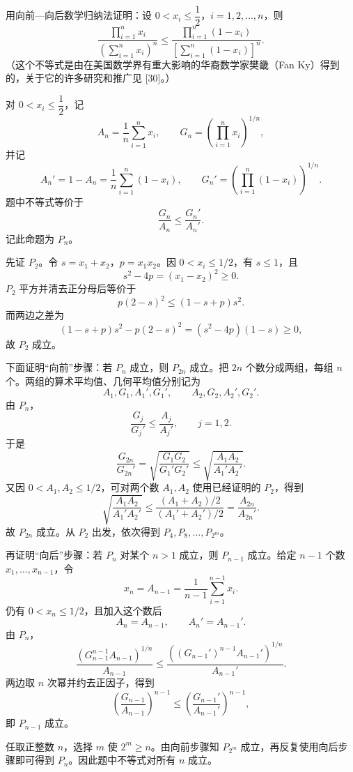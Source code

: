 \begin{xexercise}[7]
用向前—向后数学归纳法证明：设 $0<x_i\le\dfrac12$，$i=1,2,\ldots,n$，则
\[
  \frac{\displaystyle\prod_{i=1}^n x_i}
       {\left(\displaystyle\sum_{i=1}^n x_i\right)^n}
  \le
  \frac{\displaystyle\prod_{i=1}^n(1-x_i)}
       {\left[\displaystyle\sum_{i=1}^n(1-x_i)\right]^n}.
\]
（这个不等式是由在美国数学界有重大影响的华裔数学家樊畿（Fan Ky）得到的，关于它的许多研究和推广见 [30]。）
\end{xexercise}
\begin{xsolution}
对 $0<x_i\le\dfrac12$，记
\[
  A_n=\frac1n\sum_{i=1}^n x_i,
  \qquad
  G_n=\left(\prod_{i=1}^n x_i\right)^{1/n},
\]
并记
\[
  A_n'=1-A_n=\frac1n\sum_{i=1}^n(1-x_i),
  \qquad
  G_n'=\left(\prod_{i=1}^n(1-x_i)\right)^{1/n}.
\]
题中不等式等价于
\[
  \frac{G_n}{A_n}\le\frac{G_n'}{A_n'}.
\]
记此命题为 $P_n$。

先证 $P_2$。令 $s=x_1+x_2$，$p=x_1x_2$。因 $0<x_i\le1/2$，有 $s\le1$，且
\[
  s^2-4p=(x_1-x_2)^2\ge0.
\]
$P_2$ 平方并清去正分母后等价于
\[
  p(2-s)^2\le(1-s+p)s^2.
\]
而两边之差为
\[
  (1-s+p)s^2-p(2-s)^2
  =(s^2-4p)(1-s)\ge0,
\]
故 $P_2$ 成立。

下面证明“向前”步骤：若 $P_n$ 成立，则 $P_{2n}$ 成立。把 $2n$ 个数分成两组，每组 $n$ 个。两组的算术平均值、几何平均值分别记为
\[
  A_1,G_1,A_1',G_1',
  \qquad
  A_2,G_2,A_2',G_2'.
\]
由 $P_n$，
\[
  \frac{G_j}{G_j'}\le\frac{A_j}{A_j'},\qquad j=1,2.
\]
于是
\[
  \frac{G_{2n}}{G_{2n}'}
  =\sqrt{\frac{G_1G_2}{G_1'G_2'}}
  \le\sqrt{\frac{A_1A_2}{A_1'A_2'}}.
\]
又因 $0<A_1,A_2\le1/2$，可对两个数 $A_1,A_2$ 使用已经证明的 $P_2$，得到
\[
  \sqrt{\frac{A_1A_2}{A_1'A_2'}}
  \le\frac{(A_1+A_2)/2}{(A_1'+A_2')/2}
  =\frac{A_{2n}}{A_{2n}'}.
\]
故 $P_{2n}$ 成立。从 $P_2$ 出发，依次得到 $P_4,P_8,\ldots,P_{2^m}$。

再证明“向后”步骤：若 $P_n$ 对某个 $n>1$ 成立，则 $P_{n-1}$ 成立。给定 $n-1$ 个数 $x_1,\ldots,x_{n-1}$，令
\[
  x_n=A_{n-1}=\frac1{n-1}\sum_{i=1}^{n-1}x_i.
\]
仍有 $0<x_n\le1/2$，且加入这个数后
\[
  A_n=A_{n-1},\qquad A_n'=A_{n-1}'.
\]
由 $P_n$，
\[
  \frac{(G_{n-1}^{n-1}A_{n-1})^{1/n}}{A_{n-1}}
  \le
  \frac{((G_{n-1}')^{n-1}A_{n-1}')^{1/n}}{A_{n-1}'}.
\]
两边取 $n$ 次幂并约去正因子，得到
\[
  \left(\frac{G_{n-1}}{A_{n-1}}\right)^{n-1}
  \le
  \left(\frac{G_{n-1}'}{A_{n-1}'}\right)^{n-1},
\]
即 $P_{n-1}$ 成立。

任取正整数 $n$，选择 $m$ 使 $2^m\ge n$。由向前步骤知 $P_{2^m}$ 成立，再反复使用向后步骤即可得到 $P_n$。因此题中不等式对所有 $n$ 成立。
\end{xsolution}


